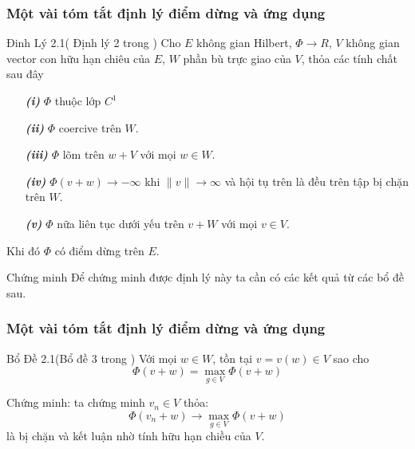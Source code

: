 \documentclass{beamer}
\begin{document}

\begin{frame}
\frametitle{Một vài tóm tắt định lý điểm dừng và ứng dụng }
\begin{block}{Đinh Lý 2.1( Định lý 2 trong \cite{YJMM})}
 Cho $E$ không gian Hilbert, $\Phi \rightarrow R$, $V$ không gian  vector con hữu hạn chiêu của $E$, $W$ phần bù trực giao của $V$, thỏa các tính chất sau đây
\begin{itemize}
\item[\textbf{\textit{(i)}}] $\Phi$ thuộc lớp $C^1$
\item[\textbf{\textit{(ii)}}] $\Phi$ coercive trên $W$.
\item[\textbf{\textit{(iii)}}] $\Phi$ lõm trên $w+V$ với mọi $w\in W$.
\item[\textbf{\textit{(iv)}}] $\Phi(v+w) \rightarrow -\infty$ khi $\|v\| \rightarrow \infty$ và hội tụ trên là đều trên tập bị chặn trên $W$.
\item[\textbf{\textit{(v)}}] $\Phi$ nữa liên tục dưới yếu trên $v+W$ với mọi $v \in V$.
\end{itemize}
Khi đó $\Phi$ có điểm dừng trên $E$.
\end{block}
\begin{block}{Chứng minh }
Để chứng minh được định lý này ta cần có các kết quả từ các bổ đề sau.
\end{block}
\end{frame}


\begin{frame}
\frametitle{Một vài tóm tắt định lý điểm dừng và ứng dụng }
\begin{block}{Bổ Đề 2.1(Bổ đề 3 trong \cite{YJMM})}
  Với mọi $w\in W$, tồn tại $v=v(w)\in V$ sao cho $$\Phi \left ( v+w \right )=\max_{g\in V}\Phi \left ( v+w \right )$$ 
\end{block}
Chứng minh: ta chứng minh $v_n\in V$ thỏa: $$\Phi \left ( v_n+w \right )\rightarrow \max_{g\in V}\Phi \left ( v+w \right )$$ là bị chặn và kết luận nhờ tính hữu hạn chiều của $V$.

\end{frame}
\end{document}
